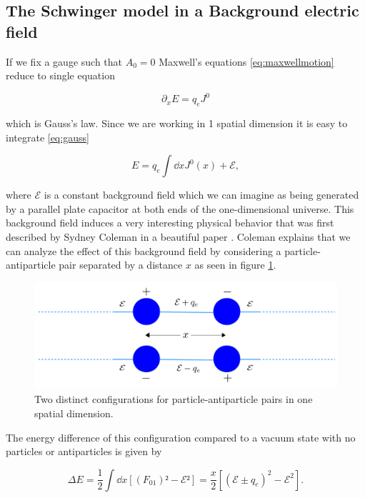 \subsection{The Schwinger model in a Background electric field}\label{ssec:BackgroundField}
If we fix a gauge such that $A_0 = 0$ Maxwell's equations \eqref{eq:maxwellmotion} reduce to single equation

\begin{equation}
\partial_x E = q_e J^0\label{eq:gauss}
\end{equation}

which is Gauss's law. Since we are working in 1 spatial dimension it is easy to integrate \eqref{eq:gauss}

\begin{equation}
E = q_e\int\dd{x}J^0(x) + \mathcal E,
\end{equation}

where $\mathcal{E}$ is a constant background field which we can imagine as being generated by a parallel plate capacitor at both ends of the one-dimensional universe. This background field induces a very interesting physical behavior that was first described by Sydney Coleman in a beautiful paper \cite{Coleman1976}. Coleman explains that we can analyze the effect of this background field by considering a particle-antiparticle pair separated by a distance $x$ as seen in figure \ref{fig:conf}. 


\begin{figure}[htb]
	\centering
	\includegraphics[scale=0.3]{figures/configuration.png}
	\caption{Two distinct configurations for particle-antiparticle pairs in one spatial dimension.}
	\label{fig:conf}
\end{figure}


The energy difference of this configuration compared to a vacuum state with no particles or antiparticles is given by 

\begin{equation}
\Delta E = \frac{1}{2}\int\dd{x}[(F_{01})² - \mathcal{E}²] = \frac{x}{2}[(\mathcal{E}\pm q_e)^2 - \mathcal{E}^2].\label{eq:energydiff}
\end{equation}

